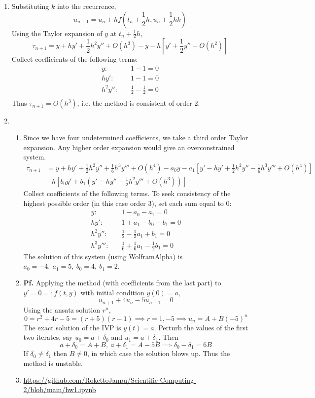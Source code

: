 \documentclass{article}
\def\tbf#1{\textbf{#1}}
\newcommand{\br}[1]{\left(#1\right)}
\newcommand{\sbr}[1]{\left[#1\right]}
\newcommand{\pf}{\tbf{Pf. }}
\newcommand{\imp}{\implies}
\begin{document}
\begin{enumerate}
\item Substituting $k$ into the recurrence,
$$u_{n+1} = u_n + hf\br{t_n+\frac12h,u_n+\frac12hk}$$
Using the Taylor expansion of $y$ at $t_n+\frac12h$,
$$\tau_{n+1} = y + hy' + \frac12h^2y'' + O(h^3) - y - h\sbr{y' + \frac12y'' + O(h^2)}$$
Collect coefficients of the following terms:
\begin{align*}
	y: &\quad 1 - 1 = 0 \\
	hy': &\quad 1 - 1 = 0 \\
	h^2y'': &\quad \frac12 - \frac12 = 0 \\
\end{align*}
Thus $\tau_{n+1}=O(h^3)$, i.e. the method is consistent of order 2.



\item

\begin{enumerate}[label=(\alph*)]
	
	\item Since we have four undetermined coefficients, we take a third order Taylor expansion. Any higher order expansion would give an overconstrained system.
	\begin{align*}
		\tau_{n+1} &= y + hy' + \frac12h^2y'' + \frac16h^3y''' + O(h^4) - a_0y - a_1\sbr{y' - hy' + \frac12h^2y'' - \frac16h^3y''' + O(h^4)}\\
		& - h\sbr{b_0y' + b_1\br{y' - hy'' + \frac12h^2y''' + O(h^3)}}
	\end{align*}
	Collect coefficients of the following terms. To seek consistency of the highest possible order (in this case order 3), set each sum equal to 0:
	\begin{align*}
		y: &\quad 1 - a_0 - a_1 = 0 \\
		hy': &\quad 1 + a_1 - b_0 - b_1 = 0 \\
		h^2y'': &\quad \frac12 - \frac12a_1 + b_1 = 0 \\
		h^3y''': &\quad \frac16+ \frac16a_1 - \frac12b_1 = 0
	\end{align*}
	The solution of this system (using WolframAlpha) is $a_0=-4,~a_1=5,~b_0=4,~b_1=2$.
	
	
	\item \pf Applying the method (with coefficients from the last part) to $y'=0=:f(t,y)$ with initial condition $y(0)=a$,
	$$u_{n+1} + 4u_n - 5u_{n-1} = 0$$
	Using the ansatz solution $r^n$,
	$$0 = r^2+4r-5 = (r+5)(r-1)
	\imp r=1,-5
	\imp u_n = A + B(-5)^n$$
	The exact solution of the IVP is $y(t)=a$. Perturb the values of the first two iterates, say $u_0=a+\delta_0$ and $u_1=a+\delta_1$. Then
	$$a+\delta_0 = A+B,~a+\delta_1 = A-5B
	\imp \delta_0 - \delta_1 = 6B$$
	If $\delta_0\ne\delta_1$ then $B\ne0$, in which case the solution blows up. Thus the method is unstable.
	
	
	\item \url{https://github.com/RokettoJanpu/Scientific-Computing-2/blob/main/hw1.ipynb}
	
\end{enumerate}



\end{enumerate}
\end{document}
